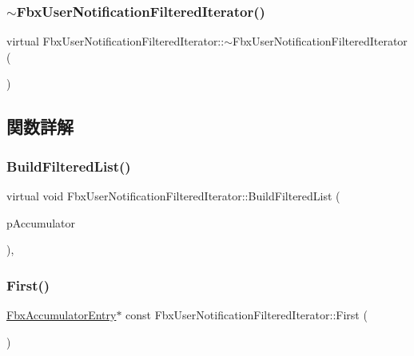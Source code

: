 \subsubsection{\texorpdfstring{$\sim$\+Fbx\+User\+Notification\+Filtered\+Iterator()}{~FbxUserNotificationFilteredIterator()}}
{\footnotesize\ttfamily virtual Fbx\+User\+Notification\+Filtered\+Iterator\+::$\sim$\+Fbx\+User\+Notification\+Filtered\+Iterator (\begin{DoxyParamCaption}{ }\end{DoxyParamCaption})\hspace{0.3cm}{\ttfamily [virtual]}}



\subsection{関数詳解}
\mbox{\label{class_fbx_user_notification_filtered_iterator_ab4aeac096dc929ed94aebe72506524ef}} 
\subsubsection{\texorpdfstring{Build\+Filtered\+List()}{BuildFilteredList()}}
{\footnotesize\ttfamily virtual void Fbx\+User\+Notification\+Filtered\+Iterator\+::\+Build\+Filtered\+List (\begin{DoxyParamCaption}\item[{\hyperlink{class_fbx_user_notification}{Fbx\+User\+Notification} \&}]{p\+Accumulator }\end{DoxyParamCaption})\hspace{0.3cm}{\ttfamily [protected]}, {\ttfamily [virtual]}}

\mbox{\label{class_fbx_user_notification_filtered_iterator_a61fc433ba00db459bac761a49e1121a2}} 
\subsubsection{\texorpdfstring{First()}{First()}}
{\footnotesize\ttfamily \hyperlink{class_fbx_accumulator_entry}{Fbx\+Accumulator\+Entry}$\ast$ const Fbx\+User\+Notification\+Filtered\+Iterator\+::\+First (\begin{DoxyParamCaption}{ }\end{DoxyParamCaption})}

